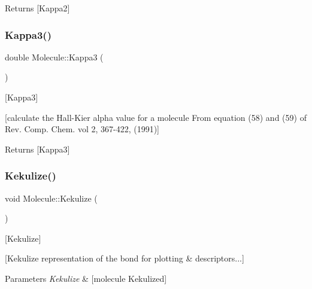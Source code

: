 \begin{DoxyReturn}{Returns}
\mbox{[}Kappa2\mbox{]} 
\end{DoxyReturn}
\mbox{\label{class_molecule_a46bf5206450f9a17bd2c256a7f37ab8b}} 
\subsubsection{\texorpdfstring{Kappa3()}{Kappa3()}}
{\footnotesize\ttfamily double Molecule\+::\+Kappa3 (\begin{DoxyParamCaption}{ }\end{DoxyParamCaption})}



\mbox{[}Kappa3\mbox{]} 

\mbox{[}calculate the Hall-\/\+Kier alpha value for a molecule From equation (58) and (59) of Rev. Comp. Chem. vol 2, 367-\/422, (1991)\mbox{]}

\begin{DoxyReturn}{Returns}
\mbox{[}Kappa3\mbox{]} 
\end{DoxyReturn}
\mbox{\label{class_molecule_ac70bc19bc462d250f2c4de320bd3330c}} 
\subsubsection{\texorpdfstring{Kekulize()}{Kekulize()}}
{\footnotesize\ttfamily void Molecule\+::\+Kekulize (\begin{DoxyParamCaption}{ }\end{DoxyParamCaption})}



\mbox{[}Kekulize\mbox{]} 

\mbox{[}Kekulize representation of the bond for plotting \& descriptors...\mbox{]}


\begin{DoxyParams}{Parameters}
{\em Kekulize} & \mbox{[}molecule Kekulized\mbox{]} \\
\hline
\end{DoxyParams}
\mbox{\label{class_molecule_a3ed0d0c3a496259b3e030dcfc2e37e39}} 
